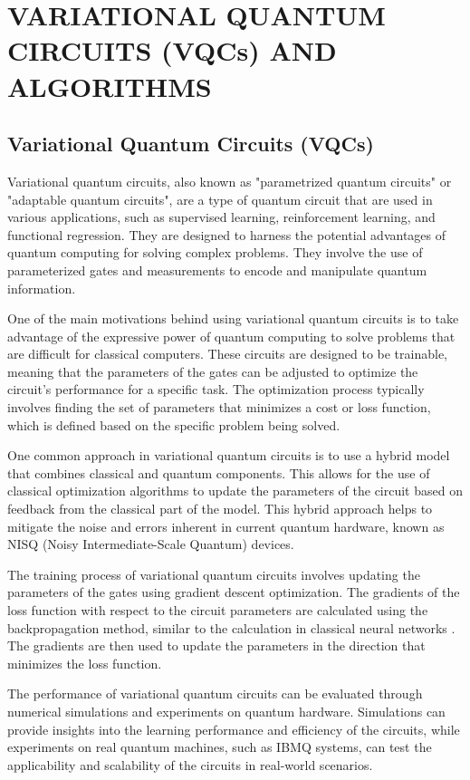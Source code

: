 \documentclass[inscr,ack,preface]{diphdthesis}
\begin{document}
\chapter{VARIATIONAL QUANTUM CIRCUITS (VQCs) AND ALGORITHMS}

\section{Variational Quantum Circuits (VQCs)}

Variational quantum circuits, also known as "parametrized quantum circuits" or "adaptable quantum circuits", are a type of quantum circuit that are used in various applications, such as supervised learning, reinforcement learning, and functional regression. They are designed to harness the potential advantages of quantum computing for solving complex problems. They involve the use of parameterized gates and measurements to encode and manipulate quantum information.

One of the main motivations behind using variational quantum circuits is to take advantage of the expressive power of quantum computing to solve problems that are difficult for classical computers. These circuits are designed to be trainable, meaning that the parameters of the gates can be adjusted to optimize the circuit's performance for a specific task. The optimization process typically involves finding the set of parameters that minimizes a cost or loss function, which is defined based on the specific problem being solved\cite{vqc}.

One common approach in variational quantum circuits is to use a hybrid model that combines classical and quantum components. This allows for the use of classical optimization algorithms to update the parameters of the circuit based on feedback from the classical part of the model. This hybrid approach helps to mitigate the noise and errors inherent in current quantum hardware, known as NISQ (Noisy Intermediate-Scale Quantum) devices\cite{vqc2}.

The training process of variational quantum circuits involves updating the parameters of the gates using gradient descent optimization. The gradients of the loss function with respect to the circuit parameters are calculated using the backpropagation method, similar to the calculation in classical neural networks \cite{vqc_arch}. The gradients are then used to update the parameters in the direction that minimizes the loss function.

The performance of variational quantum circuits can be evaluated through numerical simulations and experiments on quantum hardware. Simulations can provide insights into the learning performance and efficiency of the circuits, while experiments on real quantum machines, such as IBMQ systems, can test the applicability and scalability of the circuits in real-world scenarios.
\end{document}
